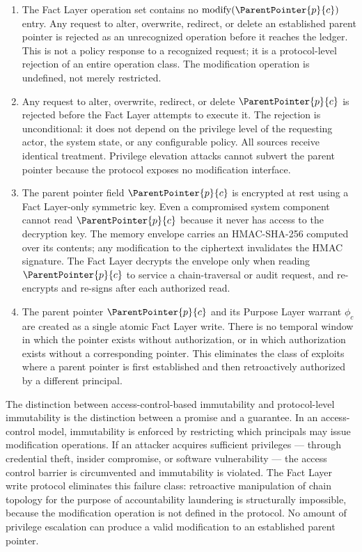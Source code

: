 \begin{enumerate}
    \item[(W1) \textbf{No modification operation defined.}] The Fact Layer operation set contains no $\mathrm{modify}(\ParentPointer{p}{c})$ entry. Any request to alter, overwrite, redirect, or delete an established parent pointer is rejected as an unrecognized operation before it reaches the ledger. This is not a policy response to a recognized request; it is a protocol-level rejection of an entire operation class. The modification operation is undefined, not merely restricted.

    \item[(W2) \textbf{All modification requests rejected unconditionally.}] Any request to alter, overwrite, redirect, or delete $\ParentPointer{p}{c}$ is rejected before the Fact Layer attempts to execute it. The rejection is unconditional: it does not depend on the privilege level of the requesting actor, the system state, or any configurable policy. All sources receive identical treatment. Privilege elevation attacks cannot subvert the parent pointer because the protocol exposes no modification interface.

    \item[(W3) \textbf{Sealed memory envelope.}] The parent pointer field $\ParentPointer{p}{c}$ is encrypted at rest using a Fact Layer-only symmetric key. Even a compromised system component cannot read $\ParentPointer{p}{c}$ because it never has access to the decryption key. The memory envelope carries an HMAC-SHA-256 computed over its contents; any modification to the ciphertext invalidates the HMAC signature. The Fact Layer decrypts the envelope only when reading $\ParentPointer{p}{c}$ to service a chain-traversal or audit request, and re-encrypts and re-signs after each authorized read.

    \item[(W4) \textbf{Atomic provisioning.}] The parent pointer $\ParentPointer{p}{c}$ and its Purpose Layer warrant $\phi_c$ are created as a single atomic Fact Layer write. There is no temporal window in which the pointer exists without authorization, or in which authorization exists without a corresponding pointer. This eliminates the class of exploits where a parent pointer is first established and then retroactively authorized by a different principal.
\end{enumerate}

The distinction between access-control-based immutability and protocol-level immutability is the distinction between a promise and a guarantee. In an access-control model, immutability is enforced by restricting which principals may issue modification operations. If an attacker acquires sufficient privileges — through credential theft, insider compromise, or software vulnerability — the access control barrier is circumvented and immutability is violated. The Fact Layer write protocol eliminates this failure class: retroactive manipulation of chain topology for the purpose of accountability laundering is structurally impossible, because the modification operation is not defined in the protocol. No amount of privilege escalation can produce a valid modification to an established parent pointer.

